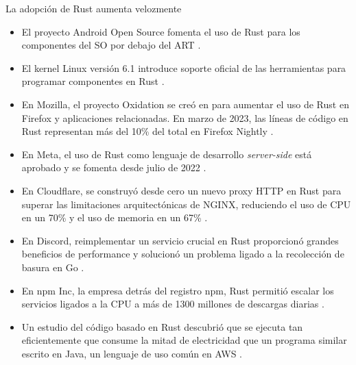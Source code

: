 \documentclass{beamer}
\begin{document}
\begin{frame}{La adopción de Rust aumenta velozmente}
  \scriptsize
  \begin{itemize}
    \item El proyecto Android Open Source fomenta
          el uso de Rust para los componentes del SO
          por debajo del ART \cite{stoep2021}.
    \item El kernel Linux versión 6.1 introduce soporte oficial de las herramientas
          para programar componentes en Rust \cite{corbet2022,desimone2022}.
    \item En Mozilla, el proyecto Oxidation se creó en 
          para aumentar el uso de Rust en Firefox y aplicaciones relacionadas. 
          En marzo de 2023, las líneas de código en Rust representan
          más del 10\% del total en Firefox Nightly \cite{mozilla-oxidation}.
    \item En Meta, el uso de Rust como lenguaje de desarrollo \emph{server-side}
          está aprobado y se fomenta desde julio de 2022 \cite{garcia2022}.
    \item En Cloudflare, se construyó desde cero un nuevo proxy HTTP en Rust
          para superar las limitaciones arquitectónicas de NGINX,
          reduciendo el uso de CPU en un 70\% y el uso de memoria en un 67\% \cite{wu2022}.
    \item En Discord, reimplementar un servicio crucial
          en Rust proporcionó grandes beneficios de performance
          y solucionó un problema ligado a la recolección de basura en Go \cite{howarth2020}.
    \item En npm Inc, la empresa detrás del registro npm,
          Rust permitió escalar los servicios ligados a la CPU
          a más de 1300 millones de descargas diarias \cite{rust-npm-case-study}.
    \item Un estudio del código basado en Rust descubrió que se ejecuta tan eficientemente
          que consume la mitad de electricidad que un programa similar escrito en Java,
          un lenguaje de uso común en AWS \cite{pereira2017energy}.
  \end{itemize}
\end{frame}
\end{document}
